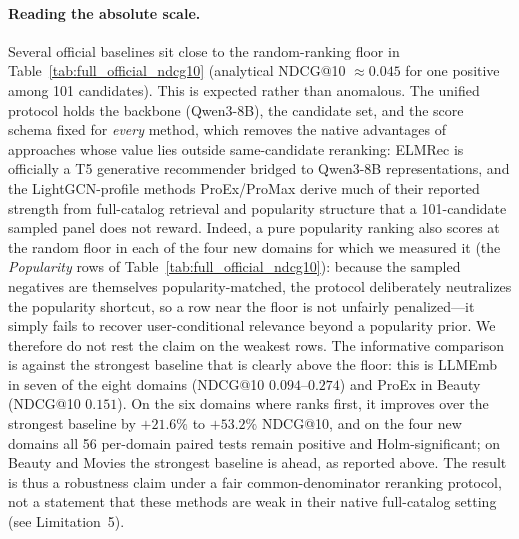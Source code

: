 




\paragraph{Reading the absolute scale.} Several official baselines sit close to
the random-ranking floor in Table~\ref{tab:full_official_ndcg10} (analytical
NDCG@10 $\approx 0.045$ for one positive among 101 candidates). This is expected
rather than anomalous. The unified protocol holds the backbone (Qwen3-8B), the
candidate set, and the score schema fixed for \emph{every} method, which removes
the native advantages of approaches whose value lies outside same-candidate
reranking: ELMRec is officially a T5 generative recommender bridged to Qwen3-8B
representations, and the LightGCN-profile methods ProEx/ProMax derive much of
their reported strength from full-catalog retrieval and popularity structure
that a 101-candidate sampled panel does not reward. Indeed, a pure popularity
ranking also scores at the random floor in each of the four new domains for
which we measured it (the \textit{Popularity} rows of
Table~\ref{tab:full_official_ndcg10}): because the sampled negatives are
themselves popularity-matched, the protocol deliberately neutralizes the
popularity shortcut, so a row near the floor is not unfairly penalized---it
simply fails to recover user-conditional relevance beyond a popularity prior.
We therefore do not rest the claim on the weakest rows. The informative
comparison is against the strongest baseline that is clearly above the floor:
this is LLMEmb in seven of the eight domains (NDCG@10 $0.094$--$0.274$) and
ProEx in Beauty (NDCG@10 $0.151$). On the six domains where \method{} ranks
first, it improves over the strongest baseline by $+21.6\%$ to $+53.2\%$
NDCG@10, and on the four new domains all 56 per-domain paired tests remain
positive and Holm-significant; on Beauty and Movies the strongest baseline is
ahead, as reported above. The result is thus a robustness claim under a fair
common-denominator reranking protocol, not a statement that these methods are
weak in their native full-catalog setting (see Limitation~5).

